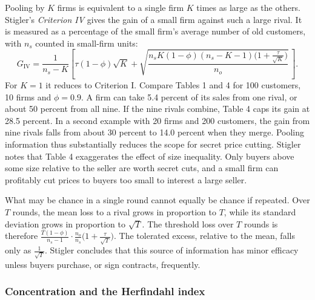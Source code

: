 Pooling by $K$ firms is equivalent to a single firm $K$ times as large as the others. Stigler's \emph{Criterion IV}
gives the gain of a small firm against such a large rival. It is measured as a percentage of the small firm's
average number of old customers, with $n_s$ counted in small-firm units:
\begin{equation}\label{eq:02-stigler-crit4}
G_{\mathrm{IV}} = \frac{1}{n_s - K}\left[\tau(1 - \phi)\sqrt{K}
+ \sqrt{\frac{n_sK(1 - \phi)(n_s - K - 1)\bigl(1 + \frac{\tau}{\sqrt{K}}\bigr)}{n_o}}\,\right].
\end{equation} For $K = 1$ it reduces to Criterion I. Compare Tables 1 and 4 for 100
customers, 10 firms and $\phi = 0.9$. A firm can take 5.4 percent of its sales from one rival, or about 50 percent
from all nine. If the nine rivals combine, Table 4 caps its gain at 28.5 percent.
In a second example with 20 firms and 200 customers, the gain from nine rivals falls from about 30 percent to 14.0
percent when they merge. Pooling information thus substantially reduces the scope for secret price cutting.
Stigler notes that Table 4 exaggerates the effect of size inequality. Only buyers above some size relative to the
seller are worth secret cuts, and a small firm can profitably cut prices to buyers too small to interest a large
seller.

What may be chance in a single round cannot equally be chance if repeated. Over $T$ rounds, the mean loss to a
rival grows in proportion to $T$, while its standard deviation grows in proportion to $\sqrt{T}$. The threshold loss
over $T$ rounds is therefore $\frac{T(1 - \phi)}{n_s - 1}\cdot\frac{n_o}{n_s}\bigl(1 + \frac{\tau}{\sqrt{T}}\bigr)$.
The tolerated excess, relative to the mean, falls only as $\frac{1}{\sqrt{T}}$. Stigler concludes that this source of
information has minor efficacy unless buyers purchase, or sign contracts, frequently.

\subsubsection{Concentration and the Herfindahl index}


